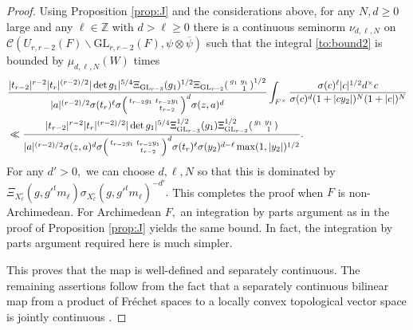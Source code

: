 \documentclass[12pt]{amsart}
\theoremstyle{remark}
\numberwithin{equation}{section}
\newcommand{\GL}{\mathrm{GL}}
\newcommand{\ZZ}{\mathbb{Z}}
\theoremstyle{definition}
\newenvironment{psmatrix}
  {\left(\begin{smallmatrix}}
  {\end{smallmatrix}\right)}
\numberwithin{equation}{subsection}
\begin{document}
\begin{proof}
Using Proposition \ref{prop:J} and the considerations above, for any $N,d \geq 0$ large and any $\ell \in \ZZ$ with $d>\ell\geq 0$ there is a continuous seminorm $\nu_{d,\ell,N}$ on $\mathcal{C}(U_{r,r-2}(F) \backslash \GL_{r,r-2}(F),\psi \otimes \overline{\psi})$ such that  the integral \eqref{to:bound2} is bounded by $\mu_{d,\ell,N}(W)$ times 
\begin{align*}
& \frac{|t_{r-2}|^{r-2}|t_r|^{(r-2)/2}|\det g_1|^{5/4}\Xi_{\GL_{r-3}}(g_1)^{1/2}\Xi_{\GL_{r-2}}\begin{psmatrix}
        g_1 &y_1 \\
          & 1
    \end{psmatrix}^{1/2}}{|a|^{(r-2)/2}\sigma(t_r)^\ell \sigma\begin{psmatrix}
        t_{r-2}g_1 &t_{r-2}y_1 \\
          & t_{r-2}
    \end{psmatrix}^{d}\sigma(z,a)^d}\int_{F^\times}\frac{\sigma(c)^{\ell}|c|^{1/2}d^\times c}{\sigma(c)^{d}(1+|cy_2|)^{N}(1+|c|)^{N}}\\
    &\ll \frac{|t_{r-2}|^{r-2}|t_r|^{(r-2)/2}|\det g_1|^{5/4}\Xi^{1/2}_{\GL_{r-3}}(g_1)\Xi_{\GL_{r-2}}^{1/2}\begin{psmatrix}
        g_1 &y_1 \\
          & 1
    \end{psmatrix}}{|a|^{(r-2)/2}\sigma(z,a)^{d}\sigma\begin{psmatrix}
        t_{r-2}g_1 &t_{r-2}y_1 \\
          & t_{r-2}
    \end{psmatrix}^{d}\sigma(t_r)^\ell \sigma(y_2)^{d-\ell}\max(1,|y_2|)^{1/2}}.
\end{align*}
For any $d'>0,$ we can choose $d,\ell,N$ so that this is dominated by  $\Xi_{X_\ell^\circ}(g,g'^tm_\ell)\sigma_{X_\ell^\circ}(g,g'^tm_\ell)^{-d'}.
$
This completes the proof when $F$ is non-Archimedean. For Archimedean $F,$ an integration by parts argument as in the proof of Proposition \ref{prop:J} yields the same bound.  In fact, the integration by parts argument required here is much simpler.

This proves that the map is well-defined and separately continuous.  The remaining assertions follow from the fact that a separately continuous bilinear map from a product of Fr\'echet spaces to a locally convex topological vector space is jointly continuous \cite[Corollary to Theorem 34.1]{Treves}. 
\end{proof}
\end{document}
